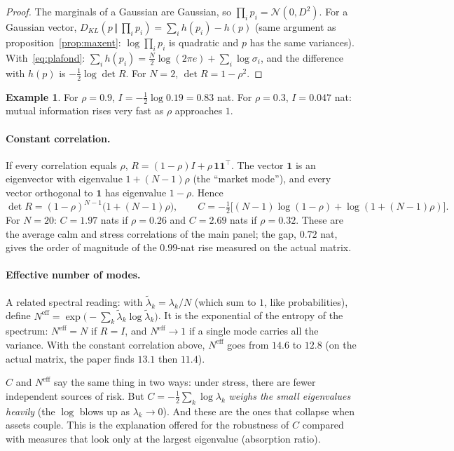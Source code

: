 \documentclass[11pt]{article}
\theoremstyle{plain}
\theoremstyle{definition}
\newtheorem{exemple}[proposition]{Example}
\theoremstyle{remark}
\newcommand{\N}{\mathcal{N}}
\newcommand{\KL}[2]{D_{KL}\!\left(#1\,\Vert\,#2\right)}
\begin{document}
\begin{proof}
The marginals of a Gaussian are Gaussian, so $\prod_ip_i=\N(0,D^2)$. For a
Gaussian vector, $\KL{p}{\prod_ip_i}=\sum_ih(p_i)-h(p)$ (same argument as
proposition~\ref{prop:maxent}: $\log\prod_ip_i$ is quadratic and $p$ has the
same variances). With~\eqref{eq:plafond}:
$\sum_ih(p_i)=\tfrac N2\log(2\pi e)+\sum_i\log\sigma_i$, and the difference
with $h(p)$ is $-\tfrac12\log\det R$. For $N=2$, $\det R=1-\rho^2$.
\end{proof}

\begin{exemple}
For $\rho=0.9$, $I=-\tfrac12\log0.19=0.83$ nat. For $\rho=0.3$,
$I=0.047$ nat: mutual information rises very fast as $\rho$ approaches $1$.
\end{exemple}

\paragraph{Constant correlation.} If every correlation equals $\rho$,
$R=(1-\rho)I+\rho\,\mathbf 1\mathbf 1^\top$. The vector $\mathbf 1$ is an
eigenvector with eigenvalue $1+(N-1)\rho$ (the ``market mode''), and every
vector orthogonal to $\mathbf 1$ has eigenvalue $1-\rho$. Hence
\[
\det R=(1-\rho)^{N-1}\bigl(1+(N-1)\rho\bigr),\qquad
C=-\tfrac12\bigl[(N-1)\log(1-\rho)+\log(1+(N-1)\rho)\bigr].
\]
For $N=20$: $C=1.97$ nats if $\rho=0.26$ and $C=2.69$ nats if $\rho=0.32$.
These are the average calm and stress correlations of the main panel; the
gap, $0.72$ nat, gives the order of magnitude of the $0.99$-nat rise measured
on the actual matrix.

\paragraph{Effective number of modes.} A related spectral reading: with
$\tilde\lambda_k=\lambda_k/N$ (which sum to $1$, like probabilities), define
$N^{\text{eff}}=\exp\bigl(-\sum_k\tilde\lambda_k\log\tilde\lambda_k\bigr)$.
It is the exponential of the entropy of the spectrum: $N^{\text{eff}}=N$ if
$R=I$, and $N^{\text{eff}}\to1$ if a single mode carries all the variance.
With the constant correlation above, $N^{\text{eff}}$ goes from $14.6$ to
$12.8$ (on the actual matrix, the paper finds $13.1$ then $11.4$).

\begin{intuition}
$C$ and $N^{\text{eff}}$ say the same thing in two ways: under stress, there
are fewer independent sources of risk. But $C=-\tfrac12\sum_k\log\lambda_k$
\emph{weighs the small eigenvalues heavily} (the $\log$ blows up as
$\lambda_k\to0$). And these are the ones that collapse when assets couple.
This is the explanation offered for the robustness of $C$ compared with
measures that look only at the largest eigenvalue (absorption ratio).
\end{intuition}
\end{document}
